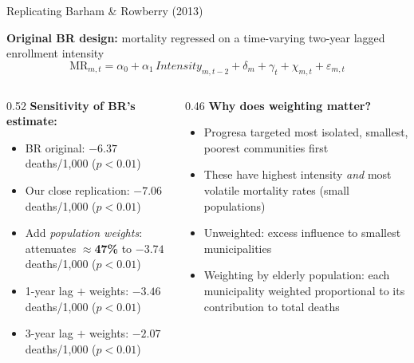 \documentclass[aspectratio=169,usenames,dvipsnames]{beamer}
\begin{document}

\begin{frame}{Replicating Barham \& Rowberry (2013)}\label{br_replication}
\small

\textbf{Original BR design:} mortality regressed on a time-varying two-year lagged enrollment intensity
\begin{equation*}
\text{MR}_{m,t} = \alpha_0 + \alpha_1\,\textit{Intensity}_{m,t-2} + \delta_m + \gamma_t + \chi_{m,t} + \varepsilon_{m,t}
\end{equation*}

\vspace{8pt}

\begin{columns}[T]
  \begin{column}{0.52\textwidth}
    \textbf{Sensitivity of BR's estimate:}
    \vspace{4pt}
    \begin{itemize}
      \item[\textbf{(A)}] BR original: $-6.37$ deaths/1,000 ($p<0.01$)
      \item[\textbf{(B)}] Our close replication: $-7.06$ deaths/1,000 ($p<0.01$)
      \vspace{4pt}
      \item[\textbf{(C)}] Add \textit{population weights}: attenuates $\approx$\textbf{47\%} to $-3.74$ deaths/1,000 ($p<0.01$)
      \vspace{4pt}
      \item[\textbf{(D)}] 1-year lag $+$ weights: $-3.46$ deaths/1,000 ($p<0.01$)
      \vspace{4pt}
      \item[\textbf{(E)}] 3-year lag $+$ weights: $-2.07$ deaths/1,000 ($p<0.01$)
    \end{itemize}
  \end{column}
  \begin{column}{0.46\textwidth}
    \textbf{Why does weighting matter?}
    \vspace{4pt}
    \begin{itemize}
      \item[$\circ$] Progresa targeted most isolated, smallest, poorest communities first
      \item[$\circ$] These have highest intensity \textit{and} most volatile mortality rates (small populations)
      \item[$\circ$] Unweighted: excess influence to smallest municipalities
      \item[$\circ$] Weighting by elderly population: each municipality weighted proportional to its contribution to total deaths
    \end{itemize}
  \end{column}
\end{columns}


\end{frame}
\end{document}
